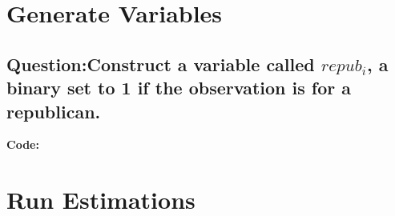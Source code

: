 \documentclass[
]{article}
\newenvironment{Shaded}{\begin{snugshade}}{\end{snugshade}}
\newcommand{\DecValTok}[1]{\textcolor[rgb]{0.00,0.00,0.81}{#1}}
\newcommand{\FunctionTok}[1]{\textcolor[rgb]{0.13,0.29,0.53}{\textbf{#1}}}
\newcommand{\NormalTok}[1]{#1}
\newcommand{\OtherTok}[1]{\textcolor[rgb]{0.56,0.35,0.01}{#1}}
\newcommand{\SpecialCharTok}[1]{\textcolor[rgb]{0.81,0.36,0.00}{\textbf{#1}}}
\begin{document}
\clearpage

\hypertarget{generate-variables}{%
\section{Generate Variables}\label{generate-variables}}

\hypertarget{questionconstruct-a-variable-called-repub_i-a-binary-set-to-1-if-the-observation-is-for-a-republican.}{%
\subsection{\texorpdfstring{Question:Construct a variable called
\(repub_i\), a binary set to 1 if the observation is for a
republican.}{Question:Construct a variable called repub\_i, a binary set to 1 if the observation is for a republican.}}\label{questionconstruct-a-variable-called-repub_i-a-binary-set-to-1-if-the-observation-is-for-a-republican.}}

\textbf{Code:}

\begin{Shaded}
\end{Shaded}

\clearpage

\hypertarget{run-estimations}{%
\section{Run Estimations}\label{run-estimations}}
\end{document}
